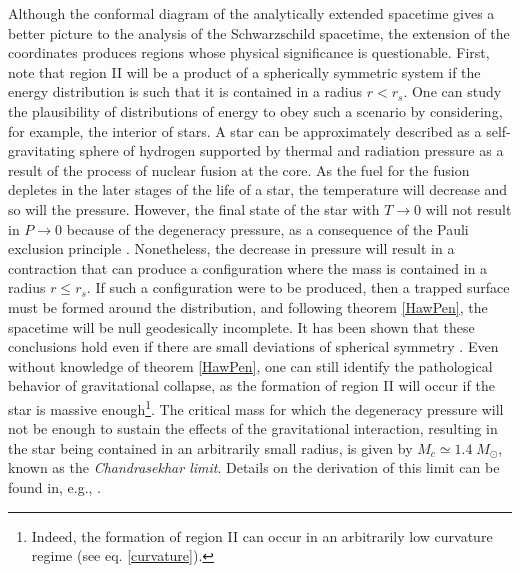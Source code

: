 \documentclass[
12pt,		%
openright,	%
twoside,  %
a4paper,			%
chapter=TITLE,		%
english,			%
french,				%
spanish,			%
brazil				%
]{USPSC-classe/USPSC}
\begin{document}
Although the conformal diagram of the analytically extended spacetime gives a better picture to the analysis of the Schwarzschild spacetime, the extension of the coordinates produces regions whose physical significance is questionable. First, note that region II will be a product of a spherically symmetric system if the energy distribution is such that it is contained in a radius $r< r_s$. One can study the plausibility of distributions of energy to obey such a scenario by considering, for example, the interior of stars. A star can be approximately described as a self-gravitating sphere of hydrogen supported by thermal and radiation pressure as a result of the process of nuclear fusion at the core. As the fuel for the fusion depletes in the later stages of the life of a star, the temperature will decrease and so will the pressure. However, the final state of the star with $T\to0$ will not result in $P\to 0$ because of the degeneracy pressure, as a consequence of the Pauli exclusion principle \cite{Sakurai1994}. Nonetheless, the decrease in pressure will result in a contraction that can produce a configuration where the mass is contained in a radius $r\leq r_s$. If such a configuration were to be produced, then a trapped surface must be formed around the distribution, and following theorem \ref{HawPen}, the spacetime will be null geodesically incomplete. It has been shown that these conclusions hold even if there are small deviations of spherical symmetry \cite{Hawking1973}. Even without knowledge of theorem \ref{HawPen}, one can still identify the pathological behavior of gravitational collapse, as the formation of region II will occur if the star is massive enough\footnote{Indeed, the formation of region II can occur in an arbitrarily low curvature regime (see eq. \ref{curvature}).}. The critical mass for which the degeneracy pressure will not be enough to sustain the effects of the gravitational interaction, resulting in the star being contained in an arbitrarily small radius, is given by $M_c\simeq 1.4\; M_{\odot}$, known as the \textit{Chandrasekhar limit}. Details on the derivation of this limit can be found in, e.g., \cite{Townsend1997}.
\end{document}
